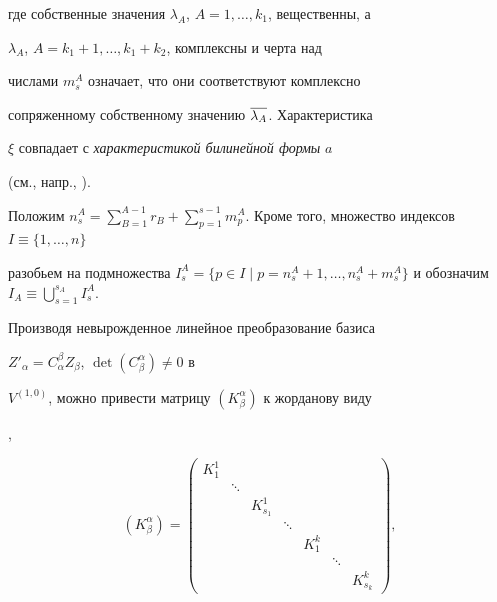 где собственные значения $\lambda_A$, $A=1,\dotsc,k_1$, вещественны, а


$\lambda_A$, $A=k_1+1,\dotsc,k_1+k_2$, комплексны и черта над


числами $m^A_s$ означает, что они соответствуют комплексно


сопряженному собственному значению $\overline{\lambda_A}$. Характеристика


$\xi$ совпадает с {\it характеристикой билинейной формы} $a$


(см., напр., \cite{am1}).





Положим $n_s^A = \sum\limits_{B=1}^{A-1} r_B + \sum\limits_{p=1}^{s-1}


m_p^A$. Кроме того, множество индексов $I\equiv \{1,\dotsc,n\}$


разобьем на подмножества $I_s^A = \{ p\in I \mid p=n^A_s+1,\dotsc,n^A_s


+m^A_s\}$ и обозначим $I_A \equiv \bigcup\limits^{s_A}_{s=1}I^A_s$.





Производя невырожденное линейное преобразование базиса


${Z'}_\alpha=C_\alpha^\beta Z_\beta$, $\det (C^\alpha_\beta) \neq 0$ в


$V^{(1,0)}$, можно привести матрицу $(K^\alpha_\beta)$ к жорданову виду


\cite{post}, \cite{shir2}


\begin{equation}


\label{2s1-3}


(K^\alpha_\beta)=


\begin{pmatrix}


K_1^1 & & & & & & \\


& \ddots & & & & & \\


& & K_{s_1}^1 & & & & \\


& & & \ddots & & & \\


& & & & K_1^k & & \\


& & & & & \ddots & \\


& & & & & & K_{s_k}^k


\end{pmatrix}


,


\end{equation}


